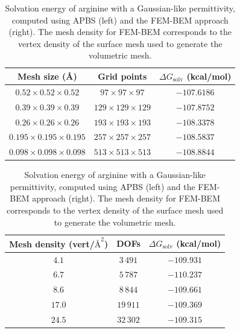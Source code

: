 \begin{table}
\centering
\footnotesize
\begin{tabular}{c|c|c}
Mesh size (\AA)  & Grid points & \parbox{2cm}{\centering$\Delta G_{\text{solv}}$\\(kcal/mol)}\\
\hline
$0.52\times0.52\times0.52$ & $97\times97\times97$ & $-107.6186$\\ 
$0.39\times0.39\times0.39$ & $129\times129\times129$ & $-107.8752$\\ 
$0.26\times0.26\times0.26$ & $193\times193\times193$ & $-108.3378$\\ 
$0.195\times0.195\times0.195$ & $257\times257\times257$ & $-108.5837$\\ 
$0.098\times0.098\times0.098$ & $513\times513\times513$ & $-108.8844$\\ 
\end{tabular}%
\hspace{3mm}%
\begin{tabular}{c|c|c}
\parbox{2.1cm}{\centering Mesh density\\(vert/$\text{\AA}^2$)}& DOFs & \parbox{2cm}{\centering$\Delta G_{\text{solv}}$\\(kcal/mol)}\\
\hline
$4.1$ & $3\,491$ & $-109.931$ \\
$6.7$ & $5\,787$ & $-110.237$ \\
$8.6$ & $8\,844$ & $-109.661$ \\
$17.0$ & $19\,911$ & $-109.369$ \\
$24.5$ & $32\,302$ & $-109.315$ \\
\end{tabular}
\caption{Solvation energy of arginine with a Gaussian-like permittivity, computed using APBS (left) and the FEM-BEM approach (right). The mesh density for FEM-BEM corresponds to the vertex density of the surface mesh used to generate the volumetric mesh.}
\label{table:arg_variable}
\end{table}


